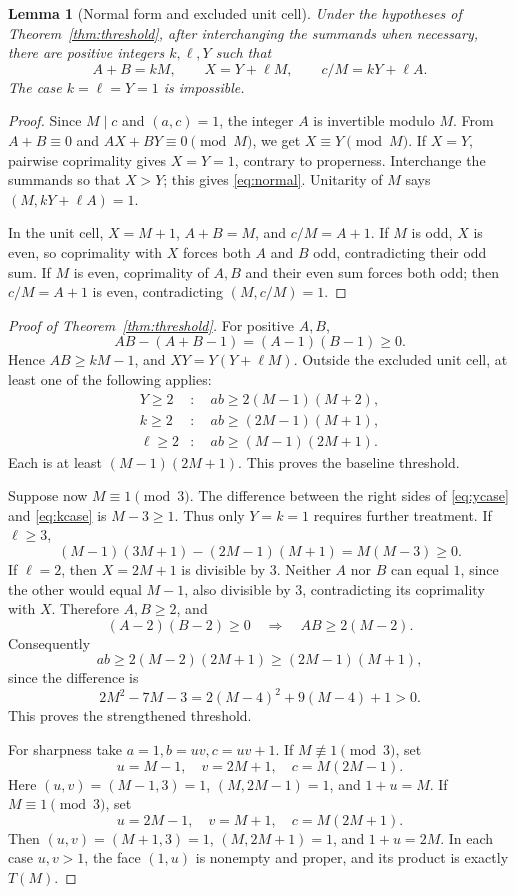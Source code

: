 \documentclass[11pt]{article}
\newtheorem{lemma}[theorem]{Lemma}
\theoremstyle{definition}\newtheorem{definition}[theorem]{Definition}
\theoremstyle{remark}\newtheorem{remark}[theorem]{Remark}
\begin{document}
\begin{lemma}[Normal form and excluded unit cell]\label{lem:cell}
Under the hypotheses of Theorem~\ref{thm:threshold}, after interchanging the summands when necessary, there are positive integers \(k,\ell,Y\) such that
\begin{equation}\label{eq:normal}
 A+B=kM,\qquad X=Y+\ell M,\qquad c/M=kY+\ell A.
\end{equation}
The case \(k=\ell=Y=1\) is impossible.
\end{lemma}
\begin{proof}
Since \(M\mid c\) and \((a,c)=1\), the integer \(A\) is invertible modulo \(M\). From \(A+B\equiv0\) and \(AX+BY\equiv0\pmod M\), we get \(X\equiv Y\pmod M\). If \(X=Y\), pairwise coprimality gives \(X=Y=1\), contrary to properness. Interchange the summands so that \(X>Y\); this gives \eqref{eq:normal}. Unitarity of \(M\) says \((M,kY+\ell A)=1\).

In the unit cell, \(X=M+1\), \(A+B=M\), and \(c/M=A+1\). If \(M\) is odd, \(X\) is even, so coprimality with \(X\) forces both \(A\) and \(B\) odd, contradicting their odd sum. If \(M\) is even, coprimality of \(A,B\) and their even sum forces both odd; then \(c/M=A+1\) is even, contradicting \((M,c/M)=1\).
\end{proof}

\begin{proof}[Proof of Theorem~\ref{thm:threshold}]
For positive \(A,B\),
\[
 AB-(A+B-1)=(A-1)(B-1)\ge0.
\]
Hence \(AB\ge kM-1\), and \(XY=Y(Y+\ell M)\). Outside the excluded unit cell, at least one of the following applies:
\begin{align}
 Y\ge2&:\quad ab\ge2(M-1)(M+2),\label{eq:ycase}\\
 k\ge2&:\quad ab\ge(2M-1)(M+1),\label{eq:kcase}\\
 \ell\ge2&:\quad ab\ge(M-1)(2M+1).\label{eq:lcase}
\end{align}
Each is at least \((M-1)(2M+1)\). This proves the baseline threshold.

Suppose now \(M\equiv1\pmod3\). The difference between the right sides of \eqref{eq:ycase} and \eqref{eq:kcase} is \(M-3\ge1\). Thus only \(Y=k=1\) requires further treatment. If \(\ell\ge3\),
\[
 (M-1)(3M+1)-(2M-1)(M+1)=M(M-3)\ge0.
\]
If \(\ell=2\), then \(X=2M+1\) is divisible by \(3\). Neither \(A\) nor \(B\) can equal \(1\), since the other would equal \(M-1\), also divisible by \(3\), contradicting its coprimality with \(X\). Therefore \(A,B\ge2\), and
\[
 (A-2)(B-2)\ge0\quad\Longrightarrow\quad AB\ge2(M-2).
\]
Consequently
\[
 ab\ge2(M-2)(2M+1)\ge(2M-1)(M+1),
\]
since the difference is
\[
 2M^2-7M-3=2(M-4)^2+9(M-4)+1>0.
\]
This proves the strengthened threshold.

For sharpness take \(a=1,b=uv,c=uv+1\). If \(M\not\equiv1\pmod3\), set
\[
 u=M-1,\quad v=2M+1,\quad c=M(2M-1).
\]
Here \((u,v)=(M-1,3)=1\), \((M,2M-1)=1\), and \(1+u=M\). If \(M\equiv1\pmod3\), set
\[
 u=2M-1,\quad v=M+1,\quad c=M(2M+1).
\]
Then \((u,v)=(M+1,3)=1\), \((M,2M+1)=1\), and \(1+u=2M\). In each case \(u,v>1\), the face \((1,u)\) is nonempty and proper, and its product is exactly \(T(M)\).
\end{proof}
\end{document}
